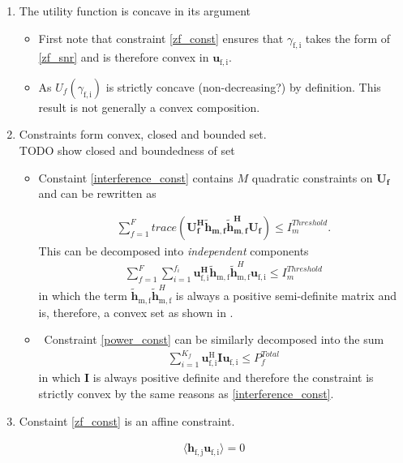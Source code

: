 \documentclass[12pt]{article}
\begin{document}
\begin{enumerate}
\item The utility function is concave in its argument 
\begin{itemize}
\item 
First note that constraint \eqref{zf_const}  ensures that $\gamma_{\mathrm{f,i}}$ takes the form of \eqref{zf_snr} and is therefore convex in ${\mathbf{u}_{\mathrm{f,i}}}$. 
\item
As $U_f(\gamma_{\mathrm{f,i}}) $ is strictly concave (non-decreasing?) by definition.
This result is not generally a convex composition.
\end{itemize}

\item
Constraints form convex, closed and bounded set. 
\\
TODO show closed and boundedness of set

\begin{itemize}

\item
	Constaint \eqref{interference_const} contains $M$ quadratic constraints on $\mathbf{U_f}$ and 
	can be rewritten as 

\begin{gather*}
	\sum_{f=1}^F
	trace(\mathbf{U_f^H} \mathbf{\tilde{h}_{m,f}} \mathbf{\tilde{h}_{m,f}^H} \mathbf{U_f} )\leq 
	I^{Threshold}_{m}.
\end{gather*}
This can be decomposed into \textit{independent} components 
	\begin{gather*}
	\sum_{f=1}^F
	\sum_{i=1}^{f_i}
	\mathbf{u_{\mathrm{f,i}}^H}\mathbf{\tilde{h}_{\mathrm{m,f}}} \mathbf{\tilde{h}}_{\mathrm{m,f}}^H
	\mathbf{u_{\mathrm{f,i}}} \leq I^{Threshold}_{m}
	\end{gather*}
in which the term $ \mathbf{\tilde{h}_{\mathrm{m,f}}} \mathbf{\tilde{h}}_{\mathrm{m,f}}^H$ is always a positive semi-definite matrix and is, therefore, a convex set as shown in 
\cite[p.8,9]{BoV:04}. 


\item \
	Constraint \eqref{power_const} can be similarly decomposed into the sum
	\begin{gather*}
		\sum_{i=1}^{K_f}\mathbf{u_{\mathrm{f,i}}^{\mathrm{H}}} \mathbf{I} 		
		\mathbf{u_{\mathrm{f,i}}} \leq  P^{Total}_{f}
	\end{gather*}
	in which $\mathbf{I}$ is always positive definite and 			
	therefore the constraint is strictly convex by the same 		
	reasons as \eqref{interference_const}.
\end{itemize}

\item 
	Constaint \eqref{zf_const} is an affine constraint. 

		\begin{gather*}
		\langle \mathbf{h_{\mathrm{f,j}}}\mathbf{u_{\mathrm{f,i}}} \rangle =0
		\end{gather*}

\end{enumerate}
\end{document}
